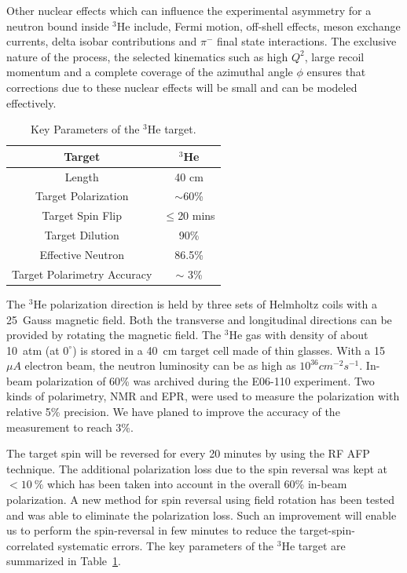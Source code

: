 Other nuclear effects which can influence the experimental asymmetry for a
neutron bound inside $^3$He include, Fermi motion, off-shell effects, meson
exchange currents, delta isobar contributions and $\pi^-$ final state
interactions. The exclusive nature of the process, the selected kinematics such
as high $Q^2$, large recoil momentum and a complete coverage of the azimuthal
angle $\phi$ ensures that corrections due to these nuclear effects will be
small and can be modeled effectively.

\begin{table}[!ht]
\centering
\begin{tabular}{|c|c|}
\hline
Target                       & $^3$He              \\\hline 
Length                       & 40 cm               \\\hline          
Target Polarization          & $\sim$60\%          \\\hline 
Target Spin Flip             & $\leq$20 mins       \\\hline 
Target Dilution              & 90\%                \\\hline
Effective Neutron            & 86.5\%              \\\hline
Target Polarimetry Accuracy  & $\sim$ 3\%          \\\hline
\end{tabular}
\caption{\footnotesize{Key Parameters of the $\mathrm{^{3}He}$
    target.}\label{table:target}}
\end{table} 

The $\mathrm{^{3}He}$ polarization direction is held by three sets of Helmholtz
coils with a 25~Gauss magnetic field. Both the transverse and longitudinal
directions can be provided by rotating the magnetic field. The
$\mathrm{^{3}He}$ gas with density of about 10~atm (at $0^{\circ}$) is stored
in a 40~cm target cell made of thin glasses. With a 15~$\mu A$ electron beam,
the neutron luminosity can be as high as $10^{36} cm^{-2}s^{-1}$. In-beam
polarization of 60\% was archived during the E06-110 experiment. Two kinds of
polarimetry, NMR and EPR, were used to measure the polarization with relative
5\% precision. We have planed to improve the accuracy of the measurement to
reach 3\%.

The target spin will be reversed for every 20 minutes by using the RF AFP
technique. The additional polarization loss due to the spin reversal was kept
at $<10~\%$ which has been taken into account in the overall 60\% in-beam
polarization. A new method for spin reversal using field rotation has been
tested and was able to eliminate the polarization loss. Such an improvement
will enable us to perform the spin-reversal in few minutes to reduce the
target-spin-correlated systematic errors. The key parameters of the
$\mathrm{^{3}He}$ target are summarized in Table~\ref{table:target}.
  
